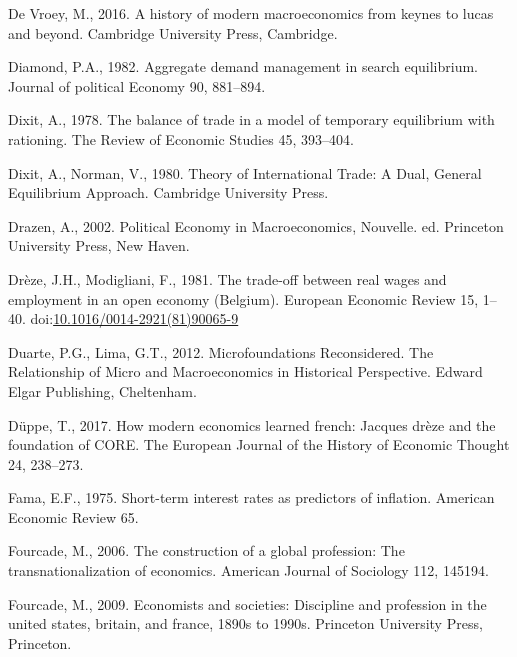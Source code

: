 \documentclass[]{elsarticle} %
\newlength{\cslhangindent}
\newlength{\cslentryspacingunit} %
\newenvironment{CSLReferences}[2] %
 {%
  \setlength{\parindent}{0pt}
  \ifodd #1
  \let\oldpar\par
  \def\par{\hangindent=\cslhangindent\oldpar}
  \fi
  \setlength{\parskip}{#2\cslentryspacingunit}
 }%
 {}
\begin{document}
\begin{CSLReferences}{1}{0}
\leavevmode{}%
De Vroey, M., 2016. A history of modern macroeconomics from keynes to
lucas and beyond. Cambridge University Press, Cambridge.

\leavevmode{}%
Diamond, P.A., 1982. Aggregate demand management in search equilibrium.
Journal of political Economy 90, 881--894.

\leavevmode{}%
Dixit, A., 1978. The balance of trade in a model of temporary
equilibrium with rationing. The Review of Economic Studies 45, 393--404.

\leavevmode{}%
Dixit, A., Norman, V., 1980. Theory of {International Trade}: {A Dual},
{General Equilibrium Approach}. {Cambridge University Press}.

\leavevmode{}%
Drazen, A., 2002. Political {Economy} in {Macroeconomics}, Nouvelle. ed.
{Princeton University Press}, {New Haven}.

\leavevmode{}%
Drèze, J.H., Modigliani, F., 1981. The trade-off between real wages and
employment in an open economy ({Belgium}). European Economic Review 15,
1--40.
doi:\href{https://doi.org/10.1016/0014-2921(81)90065-9}{10.1016/0014-2921(81)90065-9}

\leavevmode{}%
Duarte, P.G., Lima, G.T., 2012. Microfoundations {Reconsidered}. {The
Relationship} of {Micro} and {Macroeconomics} in {Historical
Perspective}. {Edward Elgar Publishing}, {Cheltenham}.

\leavevmode{}%
Düppe, T., 2017. How modern economics learned french: Jacques drèze and
the foundation of CORE. The European Journal of the History of Economic
Thought 24, 238--273.

\leavevmode{}%
Fama, E.F., 1975. Short-term interest rates as predictors of inflation.
American Economic Review 65.

\leavevmode{}%
Fourcade, M., 2006. The construction of a global profession: The
transnationalization of economics. American Journal of Sociology 112,
145194.

\leavevmode{}%
Fourcade, M., 2009. Economists and societies: Discipline and profession
in the united states, britain, and france, 1890s to 1990s. Princeton
University Press, Princeton.


\end{CSLReferences}
\end{document}
